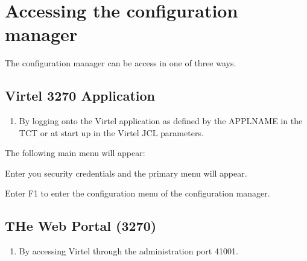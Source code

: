 \documentclass[letterpaper,10pt,english]{sphinxmanual}
\begin{document}
\section{Accessing the configuration manager}
\label{\detokenize{connectivity_guide:accessing-the-configuration-manager}}
\sphinxAtStartPar
The configuration manager can be access in one of three ways.


\subsection{Virtel 3270 Application}
\label{\detokenize{connectivity_guide:virtel-3270-application}}\begin{enumerate}
%
\item {} 
\sphinxAtStartPar
By logging onto the Virtel application as defined by the APPLNAME in the TCT or at start up in the Virtel JCL parameters.

\end{enumerate}

\begin{sphinxVerbatim}[commandchars=\\\{\}]
 
\end{sphinxVerbatim}

\sphinxAtStartPar
The following main menu will appear:\sphinxhyphen{}

\sphinxAtStartPar
{}

\sphinxAtStartPar
Enter you security credentials and the primary menu will appear.

\sphinxAtStartPar
{}

\sphinxAtStartPar
Enter F1 to enter the configuration menu of the configuration manager.

\sphinxAtStartPar
{}

\newpage


\subsection{THe Web Portal (3270)}
\label{\detokenize{connectivity_guide:the-web-portal-3270}}\begin{enumerate}
%
\setcounter{enumi}{1}
\item {} 
\sphinxAtStartPar
By accessing Virtel through the administration port 41001.

\end{enumerate}
\end{document}
